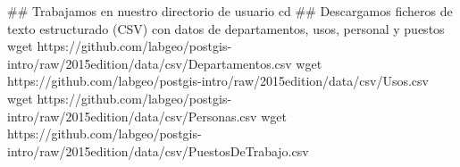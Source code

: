 \lstset{caption=Descarga de ficheros CSV,label=bash:descargarCSV}
\begin{bash}
## Trabajamos en nuestro directorio de usuario
cd
## Descargamos ficheros de texto estructurado (CSV) con datos de departamentos, usos, personal y puestos
wget https://github.com/labgeo/postgis-intro/raw/2015edition/data/csv/Departamentos.csv
wget https://github.com/labgeo/postgis-intro/raw/2015edition/data/csv/Usos.csv
wget https://github.com/labgeo/postgis-intro/raw/2015edition/data/csv/Personas.csv
wget https://github.com/labgeo/postgis-intro/raw/2015edition/data/csv/PuestosDeTrabajo.csv
\end{bash}
